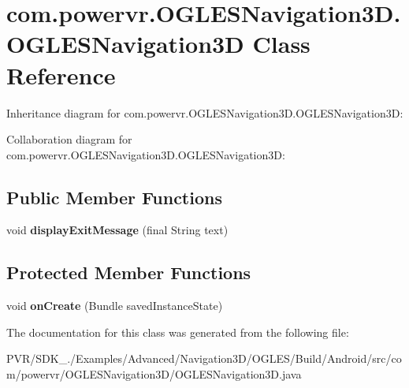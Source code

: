 \hypertarget{classcom_1_1powervr_1_1_o_g_l_e_s_navigation3_d_1_1_o_g_l_e_s_navigation3_d}{\section{com.\+powervr.\+O\+G\+L\+E\+S\+Navigation3\+D.\+O\+G\+L\+E\+S\+Navigation3\+D Class Reference}
\label{classcom_1_1powervr_1_1_o_g_l_e_s_navigation3_d_1_1_o_g_l_e_s_navigation3_d}
}


Inheritance diagram for com.\+powervr.\+O\+G\+L\+E\+S\+Navigation3\+D.\+O\+G\+L\+E\+S\+Navigation3\+D\+:


Collaboration diagram for com.\+powervr.\+O\+G\+L\+E\+S\+Navigation3\+D.\+O\+G\+L\+E\+S\+Navigation3\+D\+:
\subsection*{Public Member Functions}
\begin{DoxyCompactItemize}
\item 
\hypertarget{classcom_1_1powervr_1_1_o_g_l_e_s_navigation3_d_1_1_o_g_l_e_s_navigation3_d_abfd25d49c522814183527d4c8b4c3e2d}{void {\bfseries display\+Exit\+Message} (final String text)}\label{classcom_1_1powervr_1_1_o_g_l_e_s_navigation3_d_1_1_o_g_l_e_s_navigation3_d_abfd25d49c522814183527d4c8b4c3e2d}

\end{DoxyCompactItemize}
\subsection*{Protected Member Functions}
\begin{DoxyCompactItemize}
\item 
\hypertarget{classcom_1_1powervr_1_1_o_g_l_e_s_navigation3_d_1_1_o_g_l_e_s_navigation3_d_a1bb6eac6100513b0924c0e3dc14874b0}{void {\bfseries on\+Create} (Bundle saved\+Instance\+State)}\label{classcom_1_1powervr_1_1_o_g_l_e_s_navigation3_d_1_1_o_g_l_e_s_navigation3_d_a1bb6eac6100513b0924c0e3dc14874b0}

\end{DoxyCompactItemize}


The documentation for this class was generated from the following file\+:\begin{DoxyCompactItemize}
\item 
P\+V\+R/\+S\+D\+K\+\_./\+Examples/\+Advanced/\+Navigation3\+D/\+O\+G\+L\+E\+S/\+Build/\+Android/src/com/powervr/\+O\+G\+L\+E\+S\+Navigation3\+D/O\+G\+L\+E\+S\+Navigation3\+D.\+java\end{DoxyCompactItemize}
